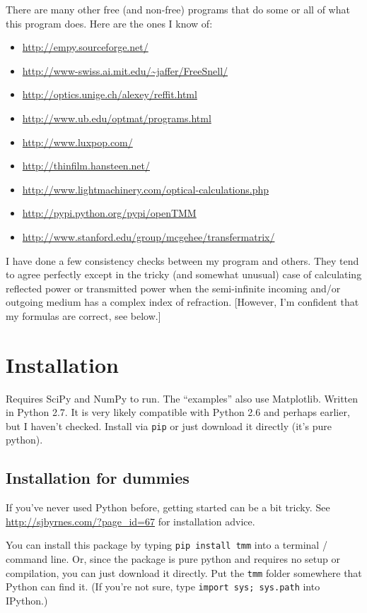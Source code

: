 \documentclass[12pt]{article}
\renewcommand{\(}{\left(}
\renewcommand{\)}{\right)}
\begin{document}
There are many other free (and non-free) programs that do some or all of what this program does. Here are the ones I know of:
\begin{itemize}
\item \url{http://empy.sourceforge.net/}
\item \url{http://www-swiss.ai.mit.edu/~jaffer/FreeSnell/}
\item \url{http://optics.unige.ch/alexey/reffit.html}
\item \url{http://www.ub.edu/optmat/programs.html}
\item \url{http://www.luxpop.com/}
\item \url{http://thinfilm.hansteen.net/}
\item \url{http://www.lightmachinery.com/optical-calculations.php}
\item \url{http://pypi.python.org/pypi/openTMM}
\item \url{http://www.stanford.edu/group/mcgehee/transfermatrix/}
\end{itemize}

I have done a few consistency checks between my program and others. They tend to agree perfectly except in the tricky (and somewhat unusual) case of calculating reflected power or transmitted power when the semi-infinite incoming and/or outgoing medium has a complex index of refraction. [However, I'm confident that my formulas are correct, see below.]

\section{Installation}

Requires SciPy and NumPy to run. The ``examples'' also use Matplotlib. Written in Python 2.7. It is very likely compatible with Python 2.6 and perhaps earlier, but I haven't checked. Install via \verb=pip= or just download it directly (it's pure python).

\subsection{Installation for dummies}

If you've never used Python before, getting started can be a bit tricky. See \url{http://sjbyrnes.com/?page_id=67} for installation advice.

You can install this package by typing \verb=pip install tmm= into a terminal / command line. Or, since the package is pure python and requires no setup or compilation, you can just download it directly. Put the \verb=tmm= folder somewhere that Python can find it. (If you're not sure, type \verb=import sys; sys.path= into IPython.)
\end{document}
